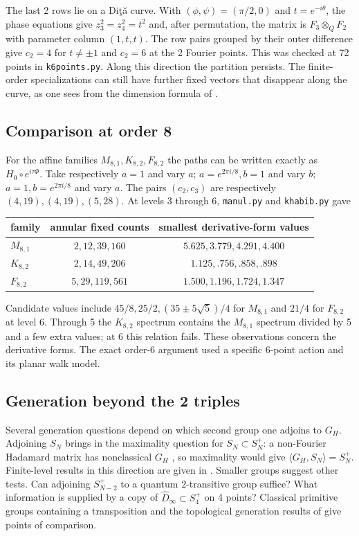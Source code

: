 \documentclass[11pt,a4paper]{amsart}
\begin{document}
The last 2 rows lie on a Di\c t\u a curve. With $(\phi,\psi)=(\pi/2,0)$ and $t=e^{-i\theta}$, the phase equations give $z_3^2=z_4^2=t^2$ and, after permutation, the matrix is $F_3\otimes_Q F_2$ with parameter column $(1,t,t)$. The row pairs grouped by their outer difference give $c_2=4$ for $t\ne\pm1$ and $c_2=6$ at the 2 Fourier points. This was checked at 72 points in \texttt{k6points.py}. Along this direction the partition persists. The finite-order specializations can still have further fixed vectors that disappear along the curve, as one sees from the dimension formula of \cite[Section 4.3]{bo}.

\subsection{Comparison at order 8}
For the affine families $M_{8,1},K_{8,2},F_{8,2}$ the paths can be written exactly as $H_0\circ e^{i\tau\Phi}$. Take respectively $a=1$ and vary $a$; $a=e^{2\pi i/8},b=1$ and vary $b$; $a=1,b=e^{2\pi i/8}$ and vary $a$. The pairs $(c_2,c_3)$ are respectively $(4,19),(4,19),(5,28)$. At levels 3 through 6, \texttt{manul.py} and \texttt{khabib.py} gave
\begin{center}\small
\begin{tabular}{lcc}
\toprule
family & annular fixed counts & smallest derivative-form values\\ \midrule
$M_{8,1}$&$2,12,39,160$&$5.625,3.779,4.291,4.400$\\
$K_{8,2}$&$2,14,49,206$&$1.125,.756,.858,.898$\\
$F_{8,2}$&$5,29,119,561$&$1.500,1.196,1.724,1.347$\\ \bottomrule
\end{tabular}
\end{center}
Candidate values include $45/8,25/2,(35\pm5\sqrt5)/4$ for $M_{8,1}$ and $21/4$ for $F_{8,2}$ at level 6. Through 5 the $K_{8,2}$ spectrum contains the $M_{8,1}$ spectrum divided by 5 and a few extra values; at 6 this relation fails. These observations concern the derivative forms. The exact order-6 argument used a specific 6-point action and its planar walk model.

\subsection{Generation beyond the 2 triples}
Several generation questions depend on which second group one adjoins to $G_H$. Adjoining $S_N$ brings in the maximality question for $S_N\subset S_N^+$: a non-Fourier Hadamard matrix has nonclassical $G_H$ \cite{banicaHM}, so maximality would give $\langle G_H,S_N\rangle=S_N^+$. Finite-level results in this direction are given in \cite{bcm}. Smaller groups suggest other tests. Can adjoining $S_{N-2}^+$ to a quantum $2$-transitive group suffice? What information is supplied by a copy of $\widehat{D}_\infty\subset S_4^+$ on 4 points? Classical primitive groups containing a transposition and the topological generation results of \cite{bcf} give points of comparison.
\end{document}
